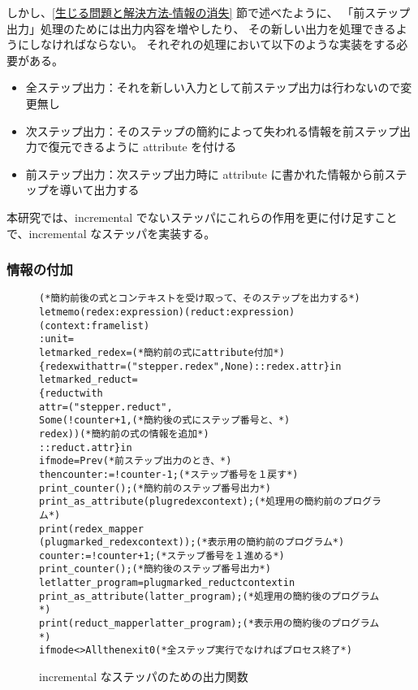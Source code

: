 しかし、\ref{生じる問題と解決方法-情報の消失} 節で述べたように、
「前ステップ出力」処理のためには出力内容を増やしたり、
その新しい出力を処理できるようにしなければならない。
それぞれの処理において以下のような実装をする必要がある。
\begin{itemize}
\item 全ステップ出力：それを新しい入力として前ステップ出力は行わないので変更無し
\item 次ステップ出力：そのステップの簡約によって失われる情報を前ステップ出力で復元できるように attribute を付ける
\item 前ステップ出力：次ステップ出力時に attribute に書かれた情報から前ステップを導いて出力する
\end{itemize}

本研究では、incremental でないステッパにこれらの作用を更に付け足すことで、incremental なステッパを実装する。

\subsubsection{情報の付加}

\begin{figure}[t]
\begin{spacing}{0.8}
  \begin{alltt}
(* 簡約前後の式とコンテキストを受け取って、そのステップを出力する *)
let memo (redex : expression) (reduct : expression) (context : frame list)
  : unit =
  let marked_redex =                            (* 簡約前の式に attribute 付加 *)
    \{redex with attr = ("stepper.redex", None) :: redex.attr\} in
  let marked_reduct =
    \{reduct with
     attr = ("stepper.reduct",
             Some (!counter + 1,                 (* 簡約後の式にステップ番号と、 *)
                   redex))                           (* 簡約前の式の情報を追加 *)
            :: reduct.attr\} in
  if mode = Prev                                      (* 前ステップ出力のとき、 *)
  then counter := !counter - 1;                        (* ステップ番号を１戻す *)
  print_counter ();                                 (* 簡約前のステップ番号出力 *)
  print_as_attribute (plug redex context);        (* 処理用の簡約前のプログラム *)
  print (redex_mapper
           (plug marked_redex context));          (* 表示用の簡約前のプログラム *)
  counter := !counter + 1;                            (* ステップ番号を１進める *)
  print_counter ();                                 (* 簡約後のステップ番号出力 *)
  let latter_program = plug marked_reduct context in
  print_as_attribute (latter_program);            (* 処理用の簡約後のプログラム *)
  print (reduct_mapper latter_program);           (* 表示用の簡約後のプログラム *)
  if mode <> All then exit 0             (* 全ステップ実行でなければプロセス終了 *)
  \end{alltt}
  \end{spacing}
  \caption{incremental なステッパのための出力関数}
  \label{figure:new-memo}
\end{figure}

